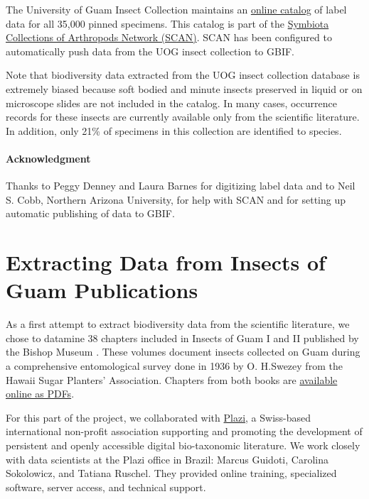\documentclass[12pt,letterpaper,english,bibliography=totocnumbered, abstract=on]{scrartcl}
\begin{document}
The University of Guam Insect Collection maintains an \href{https://scan-bugs.org/portal/collections/misc/collprofiles.php?collid=180}{online catalog} of label data for all 35,000 pinned specimens. This catalog is part of the \href{https://scan-bugs.org/portal/}{Symbiota Collections of Arthropods Network (SCAN)}. SCAN has been configured to automatically push data from the UOG insect collection to GBIF.

Note that biodiversity data extracted from the UOG insect collection database is extremely biased because soft bodied and minute insects preserved in liquid or on microscope slides are not included in the catalog. In many cases, occurrence records for these insects are currently available only from the scientific literature. In addition, only 21\% of specimens in this collection are identified to species.

\paragraph{Acknowledgment} Thanks to Peggy Denney and Laura Barnes for digitizing label data and to Neil S. Cobb, Northern Arizona University, for help with SCAN and for setting up automatic publishing of data to GBIF.





\pagebreak
\section{Extracting Data from Insects of Guam Publications}
\newrefsection[my.bib]

As a first attempt to extract biodiversity data from the scientific literature, we chose to datamine 38 chapters included in Insects of Guam I and II published by the Bishop Museum \cite{swezey1942insects, swezey1946insects}. These volumes document insects collected on Guam during a comprehensive entomological survey done in 1936 by O. H.Swezey from the Hawaii Sugar Planters' Association. Chapters from both books are \href{http://hbs.bishopmuseum.org/pubs-online/bpbm-bulletins.html}{available online as PDFs}.

For this part of the project, we collaborated with \href{https://en.wikipedia.org/wiki/Plazi}{Plazi}, a Swiss-based international non-profit association supporting and promoting the development of persistent and openly accessible digital bio-taxonomic literature. We work closely with data scientists at the Plazi office in Brazil: Marcus Guidoti, Carolina Sokolowicz, and Tatiana Ruschel. They provided online training, specialized software, server access, and technical support.
\end{document}
